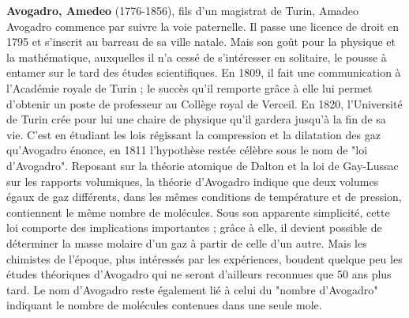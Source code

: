 \pichskip{15pt}%
\textbf{Avogadro, Amedeo} (1776-1856), fils d'un magistrat de Turin, Amadeo Avogadro commence par suivre la voie paternelle. Il passe une licence de droit en 1795 et s'inscrit au barreau de sa ville natale. Mais son goût pour la physique et la mathématique, auxquelles il n'a cessé de s'intéresser en solitaire, le pousse à entamer sur le tard des études scientifiques. En 1809, il fait une communication à l'Académie royale de Turin ; le succès qu'il remporte grâce à elle lui permet d'obtenir un poste de professeur au Collège royal de Verceil. En 1820, l'Université de Turin crée pour lui une chaire de physique qu'il gardera jusqu'à la fin de sa vie. C'est en étudiant les lois régissant la compression et la dilatation des gaz qu'Avogadro énonce, en 1811 l'hypothèse restée célèbre sous le nom de "loi d'Avogadro". Reposant sur la théorie atomique de Dalton et la loi de Gay-Lussac sur les rapports volumiques, la théorie d'Avogadro indique que deux volumes égaux de gaz différents, dans les mêmes conditions de température et de pression, contiennent le même nombre de molécules. Sous son apparente simplicité, cette loi comporte des implications importantes ; grâce à elle, il devient possible de déterminer la masse molaire d'un gaz à partir de celle d'un autre. Mais les chimistes de l'époque, plus intéressés par les expériences, boudent quelque peu les études théoriques d'Avogadro qui ne seront d'ailleurs reconnues que 50 ans plus tard. Le nom d'Avogadro reste également lié à celui du "nombre d'Avogadro" indiquant le nombre de molécules contenues dans une seule mole.

{}	
\label{sec:B}


